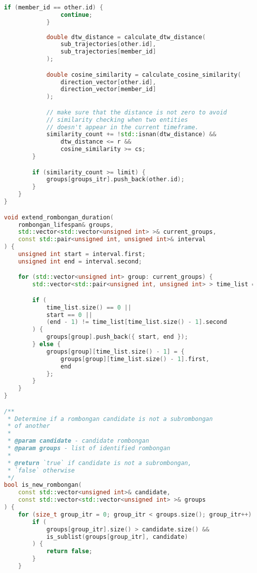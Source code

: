 \begin{lstlisting}[language=C++, caption=Implementasi fungsi \texttt{identify\_rombongan}, label={lamp:identify-rombongan}]
            if (member_id == other.id) {
                continue;
            }
        
            double dtw_distance = calculate_dtw_distance(
                sub_trajectories[other.id],
                sub_trajectories[member_id]
            );

            double cosine_similarity = calculate_cosine_similarity(
                direction_vector[other.id],
                direction_vector[member_id]
            );

            // make sure that the distance is not zero to avoid
            // similarity checking when two entities
            // doesn't appear in the current timeframe.
            similarity_count += !std::isnan(dtw_distance) &&
                dtw_distance <= r &&
                cosine_similarity >= cs;
        }

        if (similarity_count >= limit) {
            groups[groups_itr].push_back(other.id);
        }
    }
}

void extend_rombongan_duration(
    rombongan_lifespan& groups,
    std::vector<std::vector<unsigned int> >& current_groups,
    const std::pair<unsigned int, unsigned int>& interval
) {
    unsigned int start = interval.first;
    unsigned int end = interval.second;

    for (std::vector<unsigned int> group: current_groups) {
        std::vector<std::pair<unsigned int, unsigned int> > time_list = groups[group];

        if (
            time_list.size() == 0 ||
            start == 0 ||
            (end - 1) != time_list[time_list.size() - 1].second
        ) {
            groups[group].push_back({ start, end });
        } else {
            groups[group][time_list.size() - 1] = { 
                groups[group][time_list.size() - 1].first,
                end
            };
        }
    }
}

/**
 * Determine if a rombongan candidate is not a subrombongan
 * of another
 * 
 * @param candidate - candidate rombongan
 * @param groups - list of identified rombongan
 * 
 * @return `true` if candidate is not a subrombongan,
 * `false` otherwise
 */
bool is_new_rombongan(
    const std::vector<unsigned int>& candidate,
    const std::vector<std::vector<unsigned int> >& groups
) {
    for (size_t group_itr = 0; group_itr < groups.size(); group_itr++) {
        if (
            groups[group_itr].size() > candidate.size() &&
            is_sublist(groups[group_itr], candidate)
        ) {
            return false;
        }
    }


\end{lstlisting}
